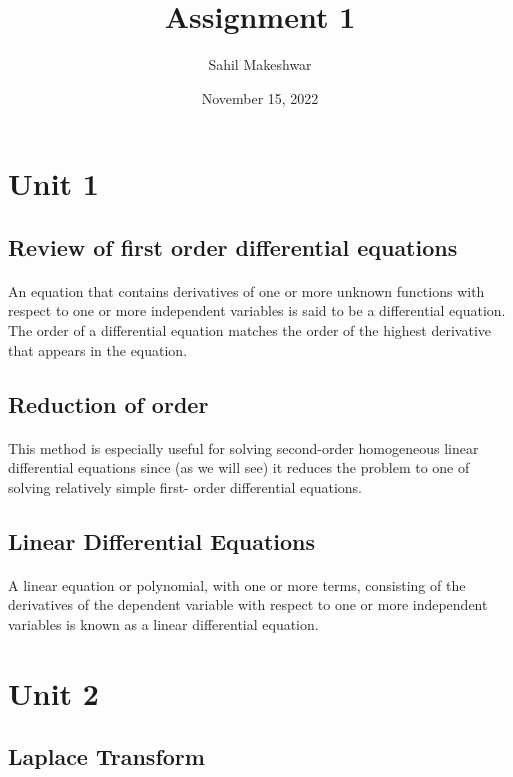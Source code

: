 \documentclass[12pt]{article}
\title{Assignment 1}
\author{Sahil Makeshwar}
\date{November 15, 2022}
\begin{document}
\maketitle
\newpage
\tableofcontents
\newpage
\section{Unit 1}
\subsection{Review of first order differential equations}
\paragraph{}
 An equation that contains derivatives of one or more unknown functions with respect to one or more independent variables is said to be a differential equation. The order of a differential equation matches the order of the highest derivative that appears in the equation.

\subsection{Reduction of order}
\paragraph{}
This method is especially useful for solving second-order homogeneous linear differential equations since (as we will see) it reduces the problem to one of solving relatively simple first- order differential equations.

\subsection{Linear Differential Equations}
\paragraph{}
A linear equation or polynomial, with one or more terms, consisting of the derivatives of the dependent variable with respect to one or more independent variables is known as a linear differential equation.
\newpage

\section{Unit 2}
\subsection{Laplace Transform}
\end{document}
